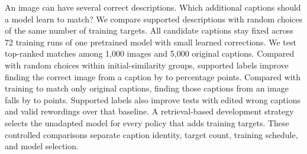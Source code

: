 An image can have several correct descriptions. Which additional captions should a model learn to match? We compare supported descriptions with random choices of the same number of training targets. All candidate captions stay fixed across 72 training runs of one pretrained model with small learned corrections. We test top-ranked matches among 1,000 images and 5,000 original captions. Compared with random choices within initial-similarity groups, supported labels improve finding the correct image from a caption by \FuStrataGainLow{} to \FuStrataGainHigh{} percentage points. Compared with training to match only original captions, finding those captions from an image falls by \FuSourceLossLow{} to \FuSourceLossHigh{} points. Supported labels also improve tests with edited wrong captions and valid rewordings over that baseline. A retrieval-based development strategy selects the unadapted model for every policy that adds training targets. These controlled comparisons separate caption identity, target count, training schedule, and model selection.
